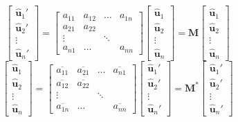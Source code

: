 \documentclass{article}      %
\newcommand{\Bu}[0]{\mathbf{u}}
\newcommand{\BM}[0]{\mathbf{M}}
\newcommand{\ucap}[1]{\hat{\Bu}_{#1}}
\begin{document}
\begin{equation}
\begin{bmatrix}
\ucap{1}' \\
\ucap{2}' \\
\vdots	  \\
\ucap{n}'
\end{bmatrix} 
= 
\begin{bmatrix}
	a_{11} & a_{12} & \dots  & a_{1n} \\
        a_{21} & a_{22} & 	  &        \\
	\vdots &        & \ddots &        \\
	a_{n1} & \dots  &        & a_{nn}
\end{bmatrix}
\begin{bmatrix}
\ucap{1}  \\
\ucap{2}  \\
\vdots	  \\
\ucap{n} 
\end{bmatrix}
= \BM 
\begin{bmatrix}
\ucap{1}  \\
\ucap{2}  \\
\vdots	  \\
\ucap{n} 
\end{bmatrix}
\end{equation}
\begin{equation}
\begin{bmatrix}
\ucap{1} \\
\ucap{2} \\
\vdots	  \\
\ucap{n}
\end{bmatrix} 
= 
\begin{bmatrix}
	\overline{a_{11}} & \overline{a_{21}} & \dots  & \overline{a_{n1}} \\
        \overline{a_{12}} & \overline{a_{22}} & 	  &        \\
	\vdots &        & \ddots &        \\
	\overline{a_{1n}} & \dots  &        & \overline{a_{nn}}
\end{bmatrix}
\begin{bmatrix}
\ucap{1}' \\
\ucap{2}' \\
\vdots	  \\
\ucap{n}'
\end{bmatrix}
= \BM^*
\begin{bmatrix}
\ucap{1}' \\
\ucap{2}' \\
\vdots	  \\
\ucap{n}'
\end{bmatrix}
\end{equation}
\end{document}
